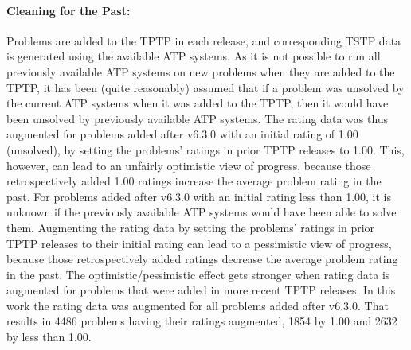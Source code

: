 \documentclass[runningheads]{llncs}
\begin{document}
\paragraph{Cleaning for the Past:}
Problems are added to the TPTP in each release, and corresponding TSTP data is generated using 
the available ATP systems.
As it is not possible to run all previously available ATP systems on new problems when they 
are added to the TPTP, it has been (quite reasonably) assumed that if a problem was unsolved by the 
current ATP systems when it was added to the TPTP, then it would have been unsolved by 
previously available ATP systems.
The rating data was thus augmented for problems added after v6.3.0 with an initial rating 
of 1.00 (unsolved), by setting the problems' ratings in prior TPTP releases to 1.00.
This, however, can lead to an unfairly optimistic view of progress, because those retrospectively 
added 1.00 ratings increase the average problem rating in the past.
For problems added after v6.3.0 with an initial rating less than 1.00, it is unknown if the
previously available ATP systems would have been able to solve them.
Augmenting the rating data by setting the problems' ratings in prior TPTP releases to their 
initial rating can lead to a pessimistic view of progress, because those retrospectively
added ratings decrease the average problem rating in the past.
The optimistic/pessimistic effect gets stronger when rating data is augmented for problems that
were added in more recent TPTP releases.
In this work the rating data was augmented for all problems added after v6.3.0.
That results in 4486 problems having their ratings augmented, 1854 by 1.00 and 2632 by less than 
1.00.

\vspace*{-0.5em}
\end{document}
